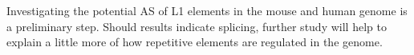 \documentclass[12pt]{article}
\begin{document}
		Investigating the potential AS of L1 elements in the mouse and human genome is a preliminary step.
		Should results indicate splicing, further study will help to explain a little more of how repetitive elements are regulated in the genome. 
		
%		 



		
\end{document}
